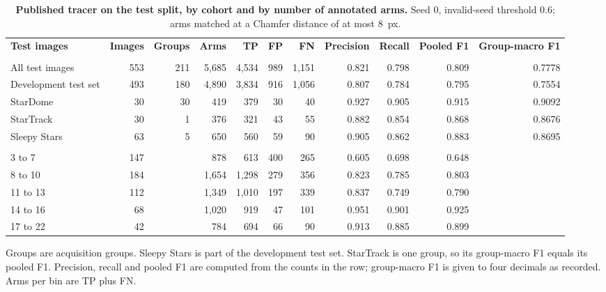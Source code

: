\begin{table}[!htbp]
\centering
\caption{\textbf{Published tracer on the test split, by cohort and by number of annotated arms.} Seed 0, invalid-seed threshold 0.6; arms matched at a Chamfer distance of at most 8~px.}
\label{tab:cohorts}
{\footnotesize
\setlength{\tabcolsep}{2.8pt}
\begin{tabular}{|l|r|r|r|r|r|r|r|r|r|r|}
\hline
\textbf{Test images} & \textbf{Images} & \textbf{Groups} & \textbf{Arms} & \textbf{TP} & \textbf{FP} & \textbf{FN} & \textbf{Precision} & \textbf{Recall} & \textbf{Pooled F1} & \textbf{Group-macro F1} \\ \thickhline
\multicolumn{11}{|l|}{\textbf{Cohort}} \\ \hline
All test images & 553 & 211 & 5,685 & 4,534 & 989 & 1,151 & 0.821 & 0.798 & 0.809 & 0.7778 \\ \hline
Development test set & 493 & 180 & 4,890 & 3,834 & 916 & 1,056 & 0.807 & 0.784 & 0.795 & 0.7554 \\ \hline
StarDome & 30 & 30 & 419 & 379 & 30 & 40 & 0.927 & 0.905 & 0.915 & 0.9092 \\ \hline
StarTrack & 30 & 1 & 376 & 321 & 43 & 55 & 0.882 & 0.854 & 0.868 & 0.8676 \\ \hline
Sleepy Stars & 63 & 5 & 650 & 560 & 59 & 90 & 0.905 & 0.862 & 0.883 & 0.8695 \\ \thickhline
\multicolumn{11}{|l|}{\textbf{Annotated arms per image, all test images}} \\ \hline
3 to 7 & 147 & & 878 & 613 & 400 & 265 & 0.605 & 0.698 & 0.648 & \\ \hline
8 to 10 & 184 & & 1,654 & 1,298 & 279 & 356 & 0.823 & 0.785 & 0.803 & \\ \hline
11 to 13 & 112 & & 1,349 & 1,010 & 197 & 339 & 0.837 & 0.749 & 0.790 & \\ \hline
14 to 16 & 68 & & 1,020 & 919 & 47 & 101 & 0.951 & 0.901 & 0.925 & \\ \hline
17 to 22 & 42 & & 784 & 694 & 66 & 90 & 0.913 & 0.885 & 0.899 & \\ \hline
\end{tabular}
}
\begin{flushleft}\small
Groups are acquisition groups.
Sleepy Stars is part of the development test set.
StarTrack is one group, so its group-macro F1 equals its pooled F1.
Precision, recall and pooled F1 are computed from the counts in the row; group-macro F1 is given to four decimals as recorded.
Arms per bin are TP plus FN.
\end{flushleft}
\end{table}

